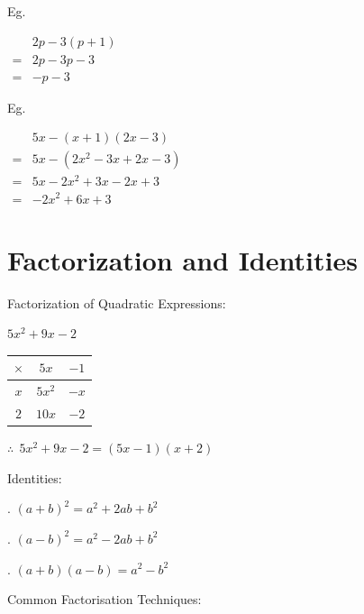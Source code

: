 \documentclass[twocolumn]{article}
\begin{document}
\noindent
Eg.

\noindent
$
\begin{aligned}
	& 2 p-3(p+1) \\
	= & 2 p-3 p-3 \\
	= & -p-3
\end{aligned}
$

\noindent
Eg.

\noindent
$
\begin{aligned}
	& 5 x-(x+1)(2 x-3) \\
	= & 5 x-\left(2 x^2-3 x+2 x-3\right) \\
	= & 5 x-2 x^2+3 x-2 x+3 \\
	= & -2 x^2+6 x+3
\end{aligned}
$

\section*{Factorization and Identities}

\noindent
Factorization of Quadratic Expressions:

\noindent
$
5 x^2+9 x-2
$

\begin{tabular}{c|c|c|}
	$\times$ & \multicolumn{1}{|c}{$5 x$} & $-1$ \\
	\hline$x$ & $5 x^2$ & $-x$ \\
	\cline { 2 - 3 } $2$ & $10 x$ & $-2$ \\
	\hline 
\end{tabular}

\noindent 
$
\therefore \ \ 5 x^2+9 x-2=(5 x-1)(x+2)
$

\bigskip 

\noindent 
Identities:

\bigskip 

. $(a+b)^2=a^2+2 a b+b^2$

. $(a-b)^2=a^2-2 a b+b^2$

. $(a+b)(a-b)=a^2-b^2$

\bigskip 

\noindent 
Common Factorisation Techniques:
\end{document}
